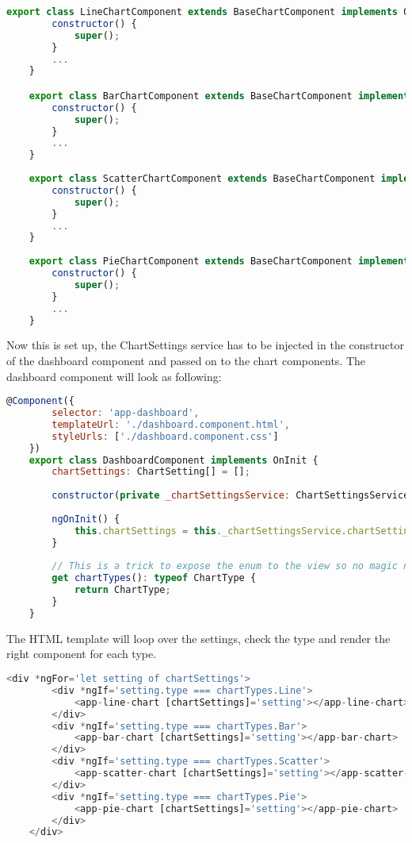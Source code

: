 \begin{lstlisting}[language=JavaScript]
	export class LineChartComponent extends BaseChartComponent implements OnInit {
		constructor() {
			super();
		}
		...
	}

	export class BarChartComponent extends BaseChartComponent implements OnInit {
		constructor() {
			super();
		}
		...
	}
	
	export class ScatterChartComponent extends BaseChartComponent implements OnInit {
		constructor() {
			super();
		}
		...
	}
	
	export class PieChartComponent extends BaseChartComponent implements OnInit {
		constructor() {
			super();
		}
		...
	}
\end{lstlisting}

Now this is set up, the ChartSettings service has to be injected in the constructor of the dashboard component and passed on to the chart components. The dashboard component will look as following:
 
\begin{lstlisting}[language=JavaScript] 	
 	@Component({
 		selector: 'app-dashboard',
 		templateUrl: './dashboard.component.html',
 		styleUrls: ['./dashboard.component.css']
 	})
 	export class DashboardComponent implements OnInit {
 		chartSettings: ChartSetting[] = [];
 		
 		constructor(private _chartSettingsService: ChartSettingsService) { }
 		
 		ngOnInit() {
 			this.chartSettings = this._chartSettingsService.chartSettings;
 		}
 	
	 	// This is a trick to expose the enum to the view so no magic numbers are needed
	 	get chartTypes(): typeof ChartType {
	 		return ChartType;
	 	}	
 	}
\end{lstlisting}

The HTML template will loop over the settings, check the type and render the right component for each type.

 
\begin{lstlisting}[language=JavaScript] 	
	<div *ngFor='let setting of chartSettings'>
		<div *ngIf='setting.type === chartTypes.Line'>
			<app-line-chart [chartSettings]='setting'></app-line-chart>
		</div>
		<div *ngIf='setting.type === chartTypes.Bar'>
			<app-bar-chart [chartSettings]='setting'></app-bar-chart>
		</div>
		<div *ngIf='setting.type === chartTypes.Scatter'>
			<app-scatter-chart [chartSettings]='setting'></app-scatter-chart>
		</div>
		<div *ngIf='setting.type === chartTypes.Pie'>
			<app-pie-chart [chartSettings]='setting'></app-pie-chart>
		</div>
	</div>
	
\end{lstlisting}


